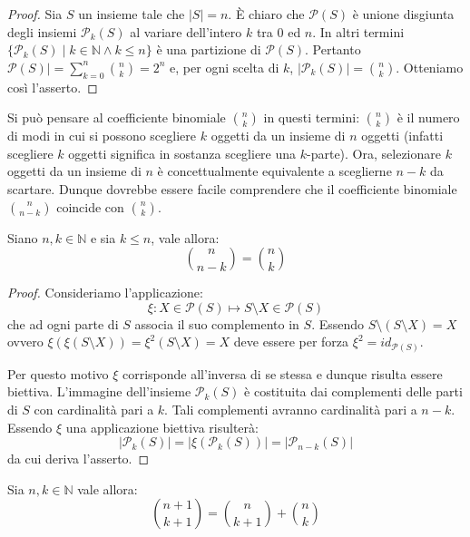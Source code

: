 \begin{proof}
	Sia $S$ un insieme tale che $|S|=n$. È chiaro che $\mathcal{P}(S)$ è unione disgiunta degli insiemi $\mathcal{P}_{k}(S)$ al variare dell'intero $k$ tra $0$ ed $n$. In altri termini $\{\mathcal{P}_{k}(S) \; | \; k \in \mathbb{N} \land k \leq n \}$ è una partizione di $\mathcal{P}(S)$. Pertanto $\mathcal{P}(S)| = \sum_{k=0}^{n} \binom{n}{k} = 2^{n}$ e, per ogni scelta di $k$, $|\mathcal{P}_{k}(S)| = \binom{n}{k}$. Otteniamo così l'asserto.
\end{proof}

Si può pensare al coefficiente binomiale $\binom{n}{k}$ in questi termini: $\binom{n}{k}$ è il numero di modi in cui si possono scegliere $k$ oggetti da un insieme di $n$ oggetti (infatti scegliere $k$ oggetti significa in sostanza scegliere una $k$-parte). Ora, selezionare $k$ oggetti da un insieme di $n$ è concettualmente equivalente a sceglierne $n-k$ da scartare. Dunque dovrebbe essere facile comprendere che il coefficiente binomiale $\binom{n}{n-k}$ coincide con $\binom{n}{k}$.

\begin{propbox}
	Siano $n,k \in \mathbb{N}$ e sia $k \leq n$, vale allora:
	\begin{equation}
		\binom{n}{n-k} = \binom{n}{k}
	\end{equation}
\end{propbox}

\begin{proof}
	Consideriamo l'applicazione: 
	$$\xi: X \in \mathcal{P}(S) \mapsto S \setminus X \in \mathcal{P}(S)$$
	che ad ogni parte di $S$ associa il suo complemento in $S$.	Essendo $S \setminus (S \setminus X )= X$ ovvero $\xi(\xi(S \setminus X)) = \xi^{2}(S \setminus X) = X$ deve essere per forza $\xi^{2} = id_{\mathcal{P}(S)}$. 
	
	Per questo motivo $\xi$ corrisponde all'inversa di se stessa e dunque risulta essere biettiva. L'immagine dell'insieme $\mathcal{P}_{k}(S)$ è costituita dai complementi delle parti di $S$ con cardinalità pari a $k$. Tali complementi avranno cardinalità pari a $n-k$. Essendo $\xi$ una applicazione biettiva risulterà:
	\begin{displaymath}
		|\mathcal{P}_{k}(S)| = |\xi(\mathcal{P}_{k}(S)) | = |\mathcal{P}_{n-k}(S)|
	\end{displaymath}
	da cui deriva l'asserto. 
\end{proof}

\begin{propbox}
	Sia $n,k \in \mathbb{N}$ vale allora:
	\begin{equation}\label{eq:binom}
		\binom{n+1}{k+1} = \binom{n}{k+1} + \binom{n}{k}
	\end{equation}
\end{propbox}

